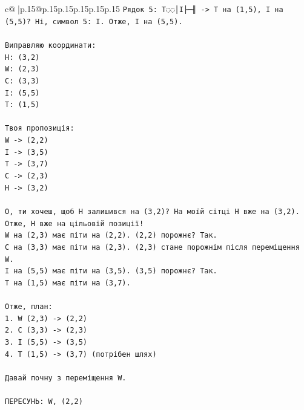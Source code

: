 \documentclass{article}
\begin{document}
{\begin{supertabular}{c@{$\;$}|p{.15\linewidth}@{}p{.15\linewidth}p{.15\linewidth}p{.15\linewidth}p{.15\linewidth}p{.15\linewidth}}
{{{\texttt{Рядок 5: T◌◌│I├─╢ {-}> T на (1,5), I на (5,5)? Ні, символ 5: I. Отже, I на (5,5).} \\
\\ 
\texttt{Виправляю координати:} \\
\texttt{H: (3,2)} \\
\texttt{W: (2,3)} \\
\texttt{C: (3,3)} \\
\texttt{I: (5,5)} \\
\texttt{T: (1,5)} \\
\\ 
\texttt{Твоя пропозиція:} \\
\texttt{W {-}> (2,2)} \\
\texttt{I {-}> (3,5)} \\
\texttt{T {-}> (3,7)} \\
\texttt{C {-}> (2,3)} \\
\texttt{H {-}> (3,2)} \\
\\ 
\texttt{О, ти хочеш, щоб H залишився на (3,2)? На моїй сітці H вже на (3,2). Отже, H вже на цільовій позиції!} \\
\texttt{W на (2,3) має піти на (2,2). (2,2) порожнє? Так.} \\
\texttt{C на (3,3) має піти на (2,3). (2,3) стане порожнім після переміщення W.} \\
\texttt{I на (5,5) має піти на (3,5). (3,5) порожнє? Так.} \\
\texttt{T на (1,5) має піти на (3,7).} \\
\\ 
\texttt{Отже, план:} \\
\texttt{1. W (2,3) {-}> (2,2)} \\
\texttt{2. C (3,3) {-}> (2,3)} \\
\texttt{3. I (5,5) {-}> (3,5)} \\
\texttt{4. T (1,5) {-}> (3,7) (потрібен шлях)} \\
\\ 
\texttt{Давай почну з переміщення W.} \\
\\ 
\texttt{ПЕРЕСУНЬ: W, (2,2)} \\
            }
        }
    }
     \\ \\


\end{supertabular}}
\end{document}
